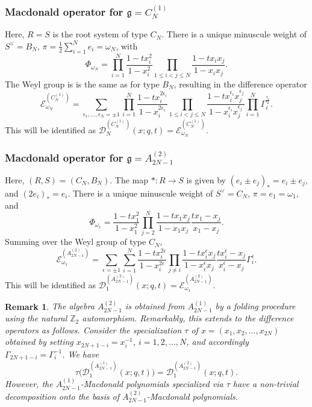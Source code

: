 \documentclass[12pt]{amsart}
\newtheorem{remark}[thm]{Remark}
\newcommand{\g}{{\mathfrak{g}}}
\newcommand{\D}{{\mathcal{D}}}
\newcommand{\Z}{{\mathbb Z}}
\numberwithin{equation}{section}
\begin{document}
\subsubsection{Macdonald operator for $\g=C_N^{(1)}$ }
\label{CNopsec}
Here, $R=S$ is the root system of type $C_N$. 
%
%
%
%
%
%
%
There is a unique minuscule weight of $S^\vee=B_N$, $\pi=\frac{1}{2}\sum_{i=1}^N e_i=\omega_N$,
with
$$
\Phi_{\omega_N}=\prod_{i=1}^N \frac{1-t x_i^2}{1-x_i^2} \prod_{1\leq i<j\leq N}\frac{1-t x_i x_j}{1-x_ix_j}.
$$
The Weyl group is is the same as for type $B_N$, resulting in the difference operator
\begin{equation}\label{CNN}
{\mathcal E}_{\omega_N}^{(C_N^{(1)})}=\sum_{\epsilon_1,...,\epsilon_N=\pm 1}\prod_{i=1}^N
\frac{1-t x_i^{2\epsilon_i}}{1-x_i^{2\epsilon_i}} 
 \prod_{1\leq i<j\leq N}  \frac{1-t x_i^{\epsilon_i}x_j^{\epsilon_j}}{1-x_i^{\epsilon_i}x_j^{\epsilon_j}}
\prod_{i=1}^N \Gamma_i^{\frac{\epsilon_i}{2}}.
\end{equation}
This will be identified as $\D_N^{(C_N^{(1)})}(x;q,t)={\mathcal E}_{\omega_N}^{(C_N^{(1)})}$.

\subsubsection{Macdonald operator for $\g=A_{2N-1}^{(2)}$ }
\label{A2Nmopsec} Here, $(R,S)=(C_N,B_N)$.
%
%
%
The map $*: R\to S$ is given by $(e_i\pm e_j)_*=e_i\pm e_j$, and $(2e_i)_*=e_i$.
There is a unique minuscule weight of $S^\vee=C_N$, $\pi=e_1=\omega_1$, and
$$
\Phi_{\omega_1}=\frac{1-t x_1^2}{1-x_1^2} \prod_{j=2}^{N}\frac{1-t x_1 x_j}{1-x_1x_j}\frac{t x_1-x_j}{x_1-x_j}.
$$
Summing over the Weyl group of type $C_N$,
$$
{\mathcal E}_{\omega_1}^{(A_{2N-1}^{(2)})}=\sum_{\epsilon=\pm 1}
\sum_{i=1}^N \frac{1-t x_i^{2\epsilon}}{1-x_i^{2\epsilon}}
\prod_{j\neq i} \frac{1-t x_i^{\epsilon} x_j}{1-x_i^{\epsilon}x_j}\frac{t x_i^{\epsilon} -x_j}{x_i^{\epsilon}-x_j}
\Gamma_i^{\epsilon}.
$$
This will be identified as $\D_1^{(A_{2N-1}^{(2)})}(x;q,t)={\mathcal E}_{\omega_1}^{(A_{2N-1}^{(2)})}$.

\begin{remark}\label{atworem}
The algebra $A_{2N-1}^{(2)}$ is obtained from $A_{2N-1}^{(1)}$ by a folding procedure using the natural $\Z_2$ automorphism. Remarkably,
this extends to the difference operators as follows. Consider the specialization $\tau$ of $x=(x_1,x_2,...,x_{2N})$ obtained by setting $x_{2N+1-i}=x_i^{-1}$, $i=1,2,...,N$,
and accordingly $\Gamma_{2N+1-i}=\Gamma_i^{-1}$. We have
$$\tau\big(\D_1^{(A_{2N-1}^{(1)})}(x;q,t)\big)=\D_1^{(A_{2N-1}^{(2)})}(x;q,t). $$
However, the $A_{2N-1}^{(1)}$-Macdonald polynomials specialized via $\tau$ have a non-trivial decomposition onto the basis of 
$A_{2N-1}^{(2)}$-Macdonald polynomials.
\end{remark}
\end{document}
